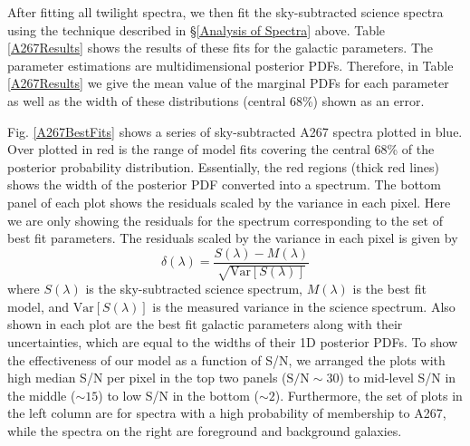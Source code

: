 \documentclass[twocolumn]{aastex6}
\begin{document}
After fitting all twilight spectra, we then fit the sky-subtracted science spectra using the technique described in \S\ref{Analysis of Spectra} above.
Table \ref{A267Results} shows the results of these fits for the galactic parameters.
The parameter estimations are multidimensional posterior PDFs.
Therefore, in Table \ref{A267Results} we give the mean value of the marginal PDFs for each parameter as well as the width of these distributions (central 68\%) shown as an error.

Fig. \ref{A267BestFits} shows a series of sky-subtracted A267 spectra plotted in blue.
Over plotted in red is the range of model fits covering the central 68\% of the posterior probability distribution.
Essentially, the red regions (thick red lines) shows the width of the posterior PDF converted into a spectrum.
The bottom panel of each plot shows the residuals scaled by the variance in each pixel.
Here we are only showing the residuals for the spectrum corresponding to the set of best fit parameters.
The residuals scaled by the variance in each pixel is given by
\begin{equation}
\label{delta residuals}
\delta(\lambda)=\frac{S(\lambda)-M(\lambda)}{\sqrt{\mathrm{Var}[S(\lambda)]}}
\end{equation}
where $S(\lambda)$ is the sky-subtracted science spectrum, $M(\lambda)$ is the best fit model, and $\mathrm{Var}[S(\lambda)]$ is the measured variance in the science spectrum.
Also shown in each plot are the best fit galactic parameters along with their uncertainties, which are equal to the widths of their 1D posterior PDFs.
To show the effectiveness of our model as a function of S/N, we arranged the plots with high median S/N per pixel in the top two panels ($\mathrm{S/N}\sim30$) to mid-level S/N in the middle ($\sim15$) to low S/N in the bottom ($\sim2$).
Furthermore, the set of plots in the left column are for spectra with a high probability of membership to A267, while the spectra on the right are foreground and background galaxies.
\end{document}
